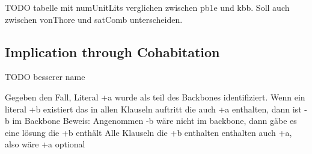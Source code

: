 TODO tabelle mit numUnitLits verglichen zwischen pb1e und kbb. Soll auch zwischen vonThore und satComb unterscheiden.

\subsection{Implication through Cohabitation} TODO besserer name

Gegeben den Fall, Literal +a wurde als teil des Backbones identifiziert.\newline
Wenn ein literal +b existiert das in allen Klauseln auftritt die auch +a enthalten, dann ist -b im Backbone\newline
Beweis: Angenommen -b wäre nicht im backbone, dann gäbe es eine lösung die +b enthält\newline
Alle Klauseln die +b enthalten enthalten auch +a, also wäre +a optional\newline
